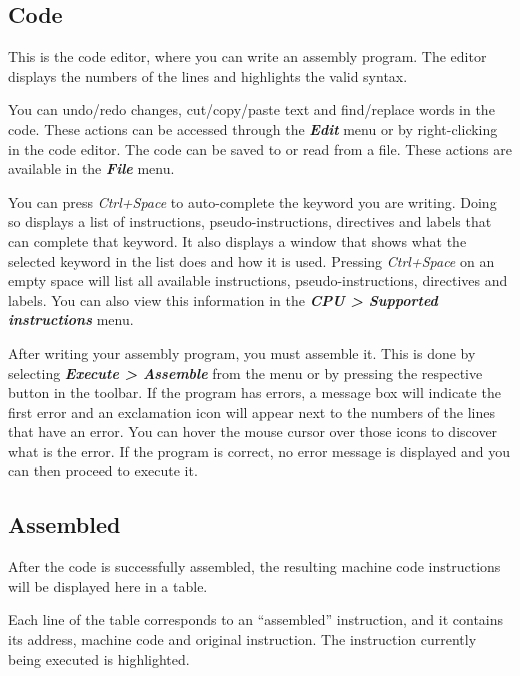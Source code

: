 \documentclass[11pt,a4paper,twoside,titlepage]{article}
\newcommand{\menupath}[1]{\textbf{\emph{#1}}}
\begin{document}
\subsection{Code}

This is the code editor, where you can write an assembly program.
The editor displays the numbers of the lines and highlights the valid syntax.

You can undo/redo changes, cut/copy/paste text and find/replace words in the
code. These actions can be accessed through the \menupath{Edit} menu or by
right-clicking in the code editor.
The code can be saved to or read from a file. These actions are available in
the \menupath{File} menu.

You can press \emph{Ctrl+Space} to auto-complete the keyword you are writing.
Doing so displays a list of instructions, pseudo-instructions, directives and
labels that can complete that keyword.
It also displays a window that shows what the selected keyword in the list does
and how it is used.
Pressing \emph{Ctrl+Space} on an empty space will list all available
instructions, pseudo-instructions, directives and labels.
You can also view this information in the 
\menupath{CPU > Supported instructions} menu.

After writing your assembly program, you must assemble it.
This is done by selecting \menupath{Execute > Assemble} from the menu or by
pressing the respective button in the toolbar.
If the program has errors, a message box will indicate the first error and an
exclamation icon will appear next to the numbers of the lines that have an
error.
You can hover the mouse cursor over those icons to discover what is the error.
If the program is correct, no error message is displayed and you can then
proceed to execute it.


\subsection{Assembled} \label{sec:assembled}

After the code is successfully assembled, the resulting machine code 
instructions will be displayed here in a table.

Each line of the table corresponds to an ``assembled'' instruction, and it
contains its address, machine code and original instruction.
The instruction currently being executed is highlighted.
\end{document}
